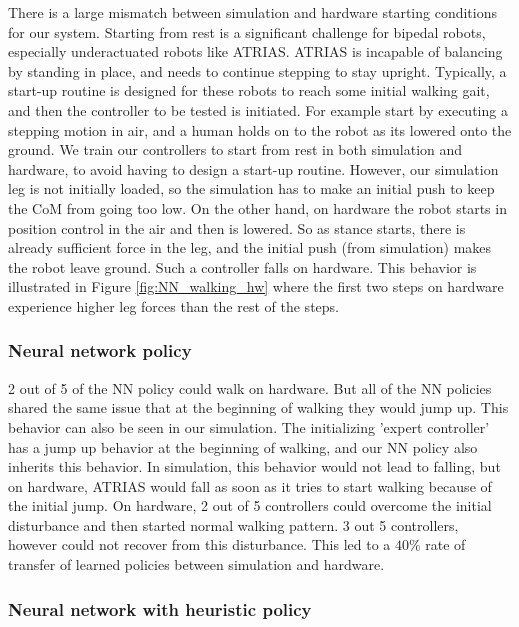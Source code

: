 There is a large mismatch between simulation and hardware starting conditions for our system. Starting from rest is a significant challenge for bipedal robots, especially underactuated robots like ATRIAS. ATRIAS is incapable of balancing by standing in place, and needs to continue stepping to stay upright. Typically, a start-up routine is designed for these robots to reach some initial walking gait, and then the controller to be tested is initiated. For example \cite{hubicki2016atrias} start by executing a stepping motion in air, and a human holds on to the robot as its lowered onto the ground. We train our controllers to start from rest in both simulation and hardware, to avoid having to design a start-up routine. However, our simulation leg is not initially loaded, so the simulation has to make an initial push to keep the CoM from going too low. On the other hand, on hardware the robot starts in position control in the air and then is lowered. So as stance starts, there is already sufficient force in the leg, and the initial push (from simulation) makes the robot leave ground. Such a controller falls on hardware. This behavior is illustrated in Figure \ref{fig:NN_walking_hw} where the first two steps on hardware experience higher leg forces than the rest of the steps.

\subsubsection{Neural network policy}

2 out of 5 of the NN policy could walk on hardware. But all of the NN policies shared the same issue that at the beginning of walking they would jump up. This behavior can also be seen in our simulation. The initializing 'expert controller' has a jump up behavior at the beginning of walking, and our NN policy also inherits this behavior. In simulation, this behavior would not lead to falling, but on hardware, ATRIAS would fall as soon as it tries to start walking because of the initial jump. On hardware, 2 out of 5 controllers could overcome the initial disturbance and then started normal walking pattern. 3 out 5 controllers, however could not recover from this disturbance. This led to a \textbf{$40\%$} rate of transfer of learned policies between simulation and hardware.

\subsubsection{Neural network with heuristic policy}

